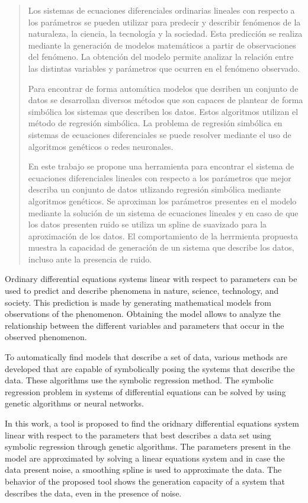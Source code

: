 \begin{abstract}

    Los sistemas de ecuaciones diferenciales ordinarias lineales con respecto a los parámetros se pueden utilizar para predecir y describir fenómenos de la naturaleza, la ciencia, la tecnología y la sociedad. Esta predicción se realiza mediante la generación de modelos matemáticos a partir de observaciones del fenómeno. La obtención del modelo permite analizar la relación entre las distintas variables y parámetros que ocurren en el fenómeno observado.

    Para encontrar de forma automática modelos que desriben un conjunto de datos se desarrollan diversos métodos que son capaces de plantear de forma simbólica los sistemas que describen los datos. Estos algoritmos utilizan el método de regresión simbólica. La problema de regresión simbólica en sistemas de ecuaciones diferenciales se puede resolver mediante el uso de algoritmos genéticos o redes neuronales.

    En este trabajo se propone una herramienta para encontrar el sistema de ecuaciones diferenciales lineales con respecto a los parámetros que mejor describa un conjunto de datos utlizando regresión simbólica mediante algoritmos genéticos. Se aproximan los parámetros presentes en el modelo mediante la solución de un sistema de ecuaciones lineales y en caso de que los datos presenten ruido se utiliza un spline de suavizado para la aproximación de los datos. El comportamiento de la herrmienta propuesta muestra la capacidad de generación de un sistema que describe los datos, incluso ante la presencia de ruido.


\end{abstract}

\begin{enabstract}

    Ordinary differential equations systems linear with respect to parameters can be used to predict and describe phenomena in nature, science, technology, and society. This prediction is made by generating mathematical models from observations of the phenomenon. Obtaining the model allows to analyze the relationship between the different variables and parameters that occur in the observed phenomenon.

    To automatically find models that describe a set of data, various methods are developed that are capable of symbolically posing the systems that describe the data. These algorithms use the symbolic regression method. The symbolic regression problem in systems of differential equations can be solved by using genetic algorithms or neural networks.

    In this work, a tool is proposed to find the oridnary differential equations system linear with respect to the parameters that best describes a data set using symbolic regression through genetic algorithms. The parameters present in the model are approximated by solving a linear equations system and in case the data present noise, a smoothing spline is used to approximate the data. The behavior of the proposed tool shows the generation capacity of a system that describes the data, even in the presence of noise.

\end{enabstract}